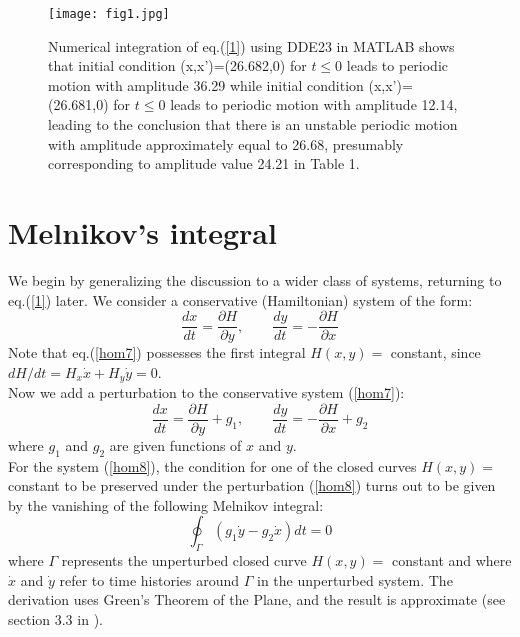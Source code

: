 \documentclass[12pt]{article}
\begin{document}
\begin{figure}[h!]
	\begin{center}
		\texttt{[image: fig1.jpg]}
		\caption{Numerical integration of eq.(\ref{1}) using DDE23 in MATLAB shows that
			initial condition (x,x')=(26.682,0) for $t\leq 0$ leads to periodic motion with amplitude 36.29 while  initial condition (x,x')=(26.681,0) for $t\leq 0$ leads to periodic motion with amplitude 12.14, leading to the conclusion that there is an unstable periodic motion with amplitude approximately equal to 26.68, presumably corresponding to amplitude value 24.21 in Table 1.}
		\label{fig:fig1}
	\end{center}
\end{figure}

\section{ Melnikov's integral}

We begin by generalizing the discussion to a wider class of systems, returning to eq.(\ref{1})
later.  We consider a conservative (Hamiltonian) system of the form:
\begin{equation}
\frac{dx}{dt}=\frac{\partial H}{\partial y},\mbox{~~~~~~}\frac{dy}{dt}=-\frac{\partial H}{\partial x}
\label{hom7}
\end{equation}
Note that eq.(\ref{hom7}) possesses the first integral $H(x,y)=$ constant, since $dH/dt=H_x \dot x+H_y\dot y=0$.\\

Now we add a perturbation to the conservative system (\ref{hom7}):
\begin{equation}
\frac{dx}{dt}=\frac{\partial H}{\partial y}+ g_1,\mbox{~~~~~~}\frac{dy}{dt}=-\frac{\partial H}{\partial x}
+ g_2
\label{hom8}
\end{equation}
where $g_1$ and $g_2$ are given functions of $x$ and $y$.\\

For the system (\ref{hom8}), the condition for one of the closed curves $H(x,y)=$ constant to be preserved under the perturbation (\ref{hom8}) turns out to be given by the vanishing of the following Melnikov integral:
\begin{equation}
\oint_\Gamma \left(g_1 \dot{y}-g_2 \dot{x}\right) dt=0
\label{hom9}
\end{equation}
where $\Gamma$ represents the unperturbed closed curve $H(x,y)=$ constant and where $\dot{x}$ and $\dot{y}$ refer to time histories around $\Gamma$ in the unperturbed system. The derivation uses Green's Theorem of the Plane, and the result is approximate (see section 3.3 in \cite{rhr}).\\
\end{document}
